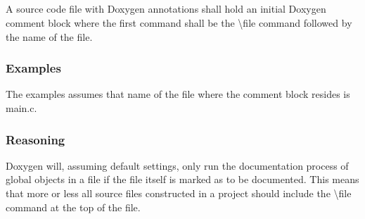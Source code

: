 \subsection*{\doxygenRule{}}

A source code file with Doxygen annotations shall hold an initial Doxygen comment block where the first command shall be the \textbackslash file command followed by the name of the file.

\subsubsection*{Examples}

The examples assumes that name of the file where the comment block resides is main.c.

\noindent
\begin{minipage}[t]{\codelstwidth\textwidth}
    
\end{minipage}\hfill
\begin{minipage}[t]{\codelstwidth\textwidth}
    
\end{minipage}

\subsubsection*{Reasoning}

Doxygen will, assuming default settings, only run the documentation process of global objects in a file if the file itself is marked as to be documented. This means that more or less all source files constructed in a project should include the \textbackslash file command at the top of the file.
